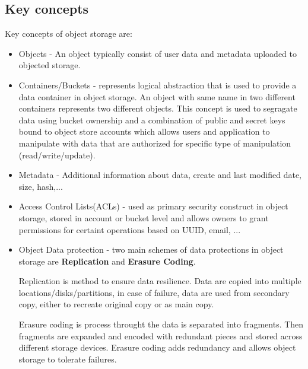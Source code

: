     \subsection{Key concepts}
    Key concepts of object storage are\cite{ibmObjectStorage}:
    \begin{itemize}
        \item{Objects - An object typically consist of user data and metadata uploaded to objected storage.}
        \item{Containers/Buckets - represents logical abstraction that is used to provide a data container in object storage. An object with same name in two different containers represents two different objects. This concept is used to segragate data using bucket ownership and a combination of public and secret keys bound to object store accounts which allows users and application to manipulate with data that are authorized for specific type of manipulation (read/write/update).}
        \item{Metadata - Additional information about data, create and last modified date, size, hash,...}
        \item{Access Control Lists(ACLs) - used as primary security construct in object storage, stored in account or bucket level and allows owners to grant permissions for certaint operations based on UUID, email, ...}
        \item{Object Data protection - two main schemes of data protections in object storage are \textbf{Replication} and \textbf{Erasure Coding}.

        Replication is method to ensure data resilience. Data are copied into multiple locations/disks/partitions, in case of failure, data are used from secondary copy, either to recreate original copy or as main copy.

        Erasure coding is process throught the data is separated into fragments. Then fragments are expanded and encoded with redundant pieces and stored across different storage devices. Erasure coding adds redundancy and allows object storage to tolerate failures.}
    \end{itemize}


